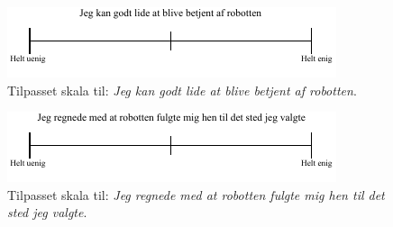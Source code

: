 \noindent
% 
%
\begin{figure}[H]
\centering
\includegraphics[width =\textwidth]{Figure/TilpasningAfSkalaer/TilpassetLideBetjening} 
\caption{Tilpasset skala til: \textit{Jeg kan godt lide at blive betjent af robotten}.}
\label{fig:TilpasningLideBetjening}
\end{figure}
\noindent
% 
%
\begin{figure}[H]
\centering
\includegraphics[width =\textwidth]{Figure/TilpasningAfSkalaer/TilpassetRobottenFulgteMigDetRigtigeStedHen} 
\caption{Tilpasset skala til: \textit{Jeg regnede med at robotten fulgte mig hen til det sted jeg valgte}.}
\label{fig:TilpasningRobottenFulgte}
\end{figure}
\noindent
% 
